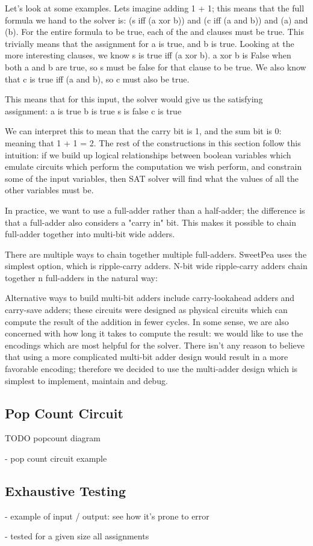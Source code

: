 Let's look at some examples. Lets imagine adding 1 + 1; this means that the full formula we hand to the solver is:
(s iff (a xor b)) and (c iff (a and b)) and (a) and (b).
For the entire formula to be true, each of the and clauses must be true. This trivially means that the assignment for a is true, and b is true. Looking at the more interesting clauses, we know s is true iff (a xor b). a xor b is False when both a and b are true, so s must be false for that clause to be true. We also know that c is true iff (a and b), so c must also be true.

This means that for this input, the solver would give us the satisfying assignment:
a is true
b is true
s is false
c is true

We can interpret this to mean that the carry bit is 1, and the sum bit is 0: meaning that 1 + 1 = 2. The rest of the constructions in this section follow this intuition: if we build up logical relationships between boolean variables which emulate circuits which perform the computation we wish perform, and constrain some of the input variables, then SAT solver will find what the values of all the other variables must be.

In practice, we want to use a full-adder rather than a half-adder; the difference is that a full-adder also considers a "carry in" bit. This makes it possible to chain full-adder together into multi-bit wide adders.

There are multiple ways to chain together multiple full-adders. SweetPea uses the simplest option, which is ripple-carry adders. N-bit wide ripple-carry adders chain together n full-adders in the natural way:

Alternative ways to build multi-bit adders include carry-lookahead adders and carry-save adders; these circuits were designed as physical circuits which can compute the result of the addition in fewer cycles. In some sense, we are also concerned with how long it takes to compute the result: we would like to use the encodings which are most helpful for the solver. There isn't any reason to believe that using a more complicated multi-bit adder design would result in a more favorable encoding; therefore we decided to use the multi-adder design which is simplest to implement, maintain and debug.

\subsection{Pop Count Circuit}

TODO popcount diagram


- pop count circuit example



\subsection{Exhaustive Testing}

- example of input / output: see how it's prone to error

- tested for a given size all assignments
